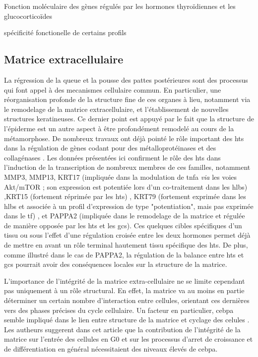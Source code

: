 \documentclass[../main.tex]{subfiles}
\begin{document}
\begin{chapter}{Fonction moléculaire des gènes régulés par les hormones thyroïdiennes et les glucocorticoïdes}
\begin{section}{spécificité fonctionelle de certains profils}
\subsection{Matrice extracellulaire}
La régression de la queue et la pousse des pattes postérieures sont des processus qui font appel à des mecanismes cellulaire commun.
En particulier, une réorganisation profonde de la structure fine de ces organes à lieu, notamment via le remodelage de la matrice extracellulaire, et l'établissement de nouvelles structures keratineuses.
Ce dernier point est appuyé par le fait que la structure de l'épiderme est un autre aspect à être profondément remodelé au cours de la métamorphose.
De nombreux travaux ont déjà pointé le rôle important des \glspl{ht} dans la régulation de gènes codant pour des métalloprotéinases et des collagénases .
Les données présentées ici confirment le rôle des \glspl{ht} dans l'induction de la transcription de nombreux membres de ces familles, notamment MMP3, MMP13, KRT17 (impliquée dans la modulation de \gls{tnfa} \textit{via} les voies Akt/mTOR ; son expression est potentiée lors d'un co-traitement dans les \glspl{hlb})
,KRT15 (fortement réprimée par les \glspl{ht})
, KRT79 (fortement exprimée dans les \glspl{hlb} et associée à un profil d'expression de type "potentiation", mais pas exprimée dans le \gls{tf})
, et PAPPA2 (impliquée dans le remodelage de la matrice et régulée de manière opposée par les \glspl{ht} et les \glspl{gc}).
Ces quelques cibles spécifiques d'un tissu ou sous l'effet d'une régulation croisée entre les deux hormones permet déjà de mettre en avant un rôle terminal hautement tissu spécifique des \glspl{ht}.
De plus, comme illustré dans le cas de PAPPA2, la régulation de la balance entre \glspl{ht} et \glspl{gc} pourrait avoir des conséquences locales sur la structure de la matrice.
\par
L'importance de l'intégrité de la matrice extra-cellulaire ne se limite cependant pas uniquement à un rôle structural.
En effet, la matrice va au moins en partie déterminer un certain nombre d'interaction entre cellules, orientant ces dernières vers des phases précises du cycle cellulaire.
Un facteur en particulier, \gls{cebpa} semble impliqué dans le lien entre structure de la matrice et cyclage des celules \citep{Rana1994}.
Les autheurs suggerent dans cet article que la contribution de l'intégrité de la matrice sur l'entrée des cellules en G0 et sur les processus d'arret de croissance et de différentiation en général nécessitaient des niveaux élevés de \gls{cebpa}.

\end{section}
\end{chapter}
\end{document}
